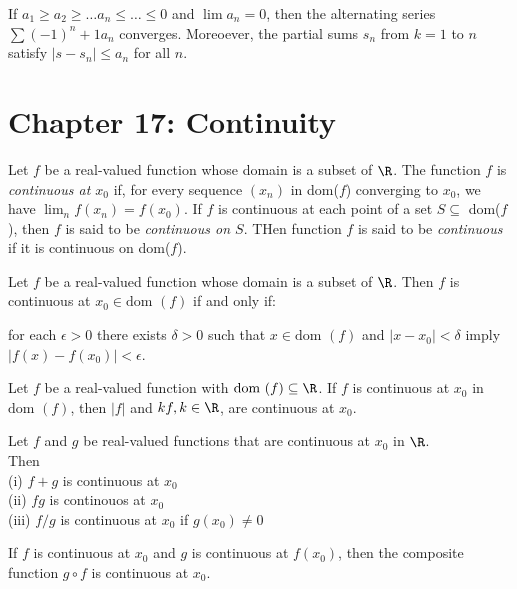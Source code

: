 \documentclass[10pt]{article}
\newcommand{\dom}{\text{dom }}
\begin{document}
\begin{thm}
If $a_1 \geq a_2 \geq \ldots a_n \leq \ldots \leq 0$ and $\lim a_n = 0$, then the alternating series $\sum (-1)^n+1a_n$ converges. Moreoever, the partial sums $s_n$ from $k = 1$ to $n$ satisfy $|s-s_n| \leq a_n$ for all $n$.

\end{thm}
\section*{Chapter 17: Continuity}
\begin{defn}
Let $f$ be a real-valued function whose domain is a subset of $\R$. The function $f$ is \emph{continuous at $x_0$} if, for every sequence $(x_n)$ in dom($f$) converging to $x_0$, we have $\lim_nf(x_n)=f(x_0)$. If $f$ is continuous at each point of a set $S\subseteq $ dom($f$), then $f$ is said to be \emph{continuous on $S$}. THen function $f$ is said to be \emph{continuous} if it is continuous on dom($f$).
\end{defn}

\begin{thm}
Let $f$ be a real-valued function whose domain is a subset of $\R$. Then $f$ is continuous at $x_0\in\dom(f)$ if and only if:

for each $\epsilon > 0$ there exists $\delta > 0$ such that $x\in\dom(f)$ and $|x-x_0|<\delta$ imply $|f(x)-f(x_0)| < \epsilon$.
\end{thm}

\begin{thm}
Let $f$ be a real-valued function with $\dom(f) \subseteq \R$. If $f$ is continuous at $x_0$ in $\dom(f)$, then $|f|$ and $kf, k\in\R$, are continuous at $x_0$.
\end{thm}

\begin{thm}
Let $f$ and $g$ be real-valued functions that are continuous at $x_0$ in $\R$.\\
Then\\
    (i) $f+g$ is continuous at $x_0$\\
    (ii) $fg$ is continouos at $x_0$\\
    (iii) $f/g$ is continuous at $x_0$ if $g(x_0)\neq 0$
\end{thm}

\begin{thm}
If $f$ is continuous at $x_0$ and $g$ is continuous at $f(x_0)$, then the composite function $g\circ f$ is continuous at $x_0$.
\end{thm}
\end{document}
